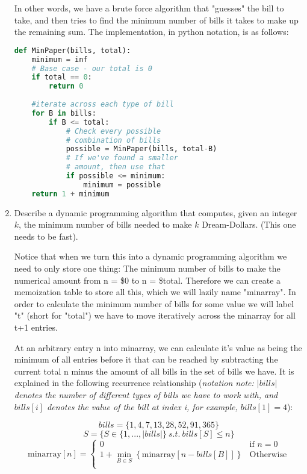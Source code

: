 \documentclass[11pt, letterpaper]{article}
\begin{document}
\begin{enumerate}
\quad In other words, we have a brute force algorithm that "guesses" the bill to take, and then tries to find the minimum number of bills it takes to make up the remaining sum. The implementation, in python notation, is as follows:

\begin{lstlisting}[language=python]
def MinPaper(bills, total):
    minimum = inf
    # Base case - our total is 0
    if total == 0:
        return 0
    
    #iterate across each type of bill
    for B in bills:
        if B <= total:
            # Check every possible 
            # combination of bills
            possible = MinPaper(bills, total-B)
            # If we've found a smaller
            # amount, then use that
            if possible <= minimum:
                minimum = possible 
    return 1 + minimum
\end{lstlisting}


\pagebreak

\item Describe a dynamic programming algorithm that computes, given an integer $k$, the minimum number of bills needed to make $k$ Dream-Dollars. (This one needs to be fast).

\quad Notice that when we turn this into a dynamic programming algorithm we need to only store one thing: The minimum number of bills to make the numerical amount from n = \$0 to n = \$total. Therefore we can create a memoization table to store all this, which we will lazily name "minarray". In order to calculate the minimum number of bills for some value we will label "t" (short for "total") we have to move iteratively across the minarray for all t+1 entries.

\quad At an arbitrary entry n into minarray, we can calculate it's value as being the minimum of all entries before it that can be reached by subtracting the current total n minus the amount of all bills in the set of bills we have. It is explained in the following recurrence relationship (\textit{notation note: $|bills|$ denotes the number of different types of bills we have to work with, and $bills[i]$ denotes the value of the bill at index i, for example, $bills[1] = 4$}):

$$ bills = \{1, 4, 7, 13, 28, 52, 91, 365 \} $$
$$ S = \{S \in \{1,...,|bills|\}\ s.t.\ bills[S] \leq n\} $$
\[
\text{minarray}[n] = 
\begin{cases}
	0 & \text{if } n = 0 \\
	1 + \underset{B \in S}{\min} \left\{ \text{minarray}[n - bills[B]] \right\} & \text{Otherwise} \\
\end{cases}
\]


\end{enumerate}
\end{document}
